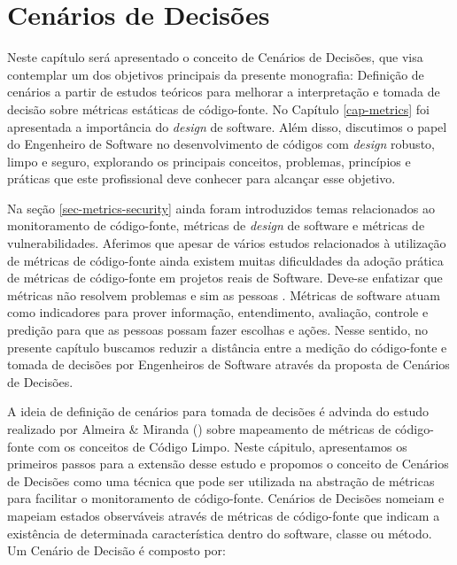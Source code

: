 \chapter{Cenários de Decisões}
\label{cap-cenarios}

Neste capítulo será apresentado o conceito de Cenários de Decisões, que visa contemplar um dos objetivos principais da presente monografia: Definição de cenários a partir de estudos teóricos para melhorar a interpretação e tomada de decisão sobre métricas estáticas de código-fonte. No Capítulo \ref{cap-metrics} foi apresentada a importância do \emph{design} de software. Além disso, discutimos o papel do Engenheiro de Software no desenvolvimento de códigos com \emph{design} robusto, limpo e seguro, explorando os principais conceitos, problemas, princípios e práticas que este profissional deve conhecer para alcançar esse objetivo. 

Na seção \ref{sec-metrics-security} ainda foram introduzidos temas relacionados ao monitoramento de código-fonte, métricas de \emph{design} de software e métricas de vulnerabilidades. Aferimos que apesar de vários estudos relacionados à utilização de métricas de código-fonte ainda existem muitas dificuldades da adoção prática de métricas de código-fonte em projetos reais de Software. Deve-se enfatizar que métricas não resolvem problemas e sim as pessoas \cite{westfall2005}. Métricas de software atuam como indicadores para prover informação, entendimento, avaliação, controle e predição para que as pessoas possam fazer escolhas e ações. Nesse sentido, no presente capítulo buscamos reduzir a distância entre a medição do código-fonte e tomada de decisões por Engenheiros de Software através da proposta de Cenários de Decisões.

A ideia de definição de cenários para tomada de decisões é advinda do estudo realizado por Almeira \& Miranda (\citeyear{almeida2010}) sobre mapeamento de métricas de código-fonte com os conceitos de Código Limpo. Neste cápitulo, apresentamos os primeiros passos para a extensão desse estudo e propomos o conceito de Cenários de Decisões como uma técnica que pode ser utilizada na abstração de métricas para facilitar o monitoramento de código-fonte. Cenários de Decisões nomeiam e mapeiam estados observáveis através de métricas de código-fonte que indicam a existência de determinada característica dentro do software, classe ou método. Um Cenário de Decisão é composto por:

